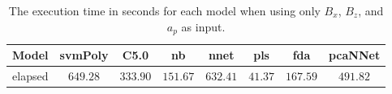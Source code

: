 \begin{table}[!ht]
	\centering
	\begin{tabular}{|c|c|c|c|c|c|c|c|}
		\hline
		Model & svmPoly & C5.0 & nb & nnet & pls & fda & pcaNNet \\ \hline
		elapsed & $649.28$ & $333.90$ & $151.67$ & $632.41$ & $41.37$ & $167.59$ & $491.82$ \\ \hline
	\end{tabular}
	\caption{The execution time in seconds for each model when using only $B_{x}$, $B_{z}$, and $a_{p}$ as input.}
	\label{tab:time:reverse:xzap:total}
\end{table}
